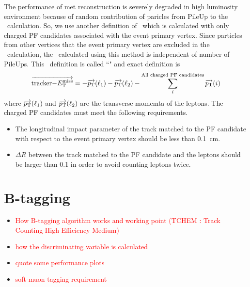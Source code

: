 The performance of met reconstruction is severely degraded in high luminosity environment 
because of random contribution of paricles from PileUp to the \met\ calculation. 
So, we use another definition of \met\ which is calculated with only charged 
PF candidates associated with the event primary vertex. Since particles from 
other vertices that the event primary vertex are excluded in the \met\ calculation,
the \met\ calculated using this method is independent of number of PileUps.  
This \met\ definition is called ``\trkmet" and exact definition is
\begin{eqnarray} 
\overrightarrow{\mathrm{tracker-}E_\mathrm{T}^{\mathrm{miss}}} 
= 
- \overrightarrow{p_\mathrm{T}} (\ell_1)  
- \overrightarrow{p_\mathrm{T}} (\ell_2)  
- \sum^{\textrm{All charged PF candidates}}_i \overrightarrow{p_\mathrm{T}}(i)
\end{eqnarray} 
where $\overrightarrow{p_\mathrm{T}} (\ell_1)$ and $\overrightarrow{p_\mathrm{T}} (\ell_2)$
are the transverse momemta of the leptons. The charged PF candidates must 
meet the following requirements.
\begin{itemize}
\item The longitudinal impact parameter of the track matched to the PF candidate 
      with respect to the event primary vertex should be less than 0.1~cm. 
\item $\Delta R$ between the track matched to the PF candidate and the leptons 
      should be larger than 0.1 in order to avoid counting leptons twice. 
\end{itemize}

\section{ B-tagging }
\begin{itemize}
\item \textcolor{red}{How B-tagging algorithm works and working point
      (TCHEM : Track Counting High Efficiency Medium)}
\item \textcolor{red}{how the discriminating variable is calculated }
\item \textcolor{red}{quote some performance plots }
\item \textcolor{red}{soft-muon tagging requirement }
\end{itemize}

